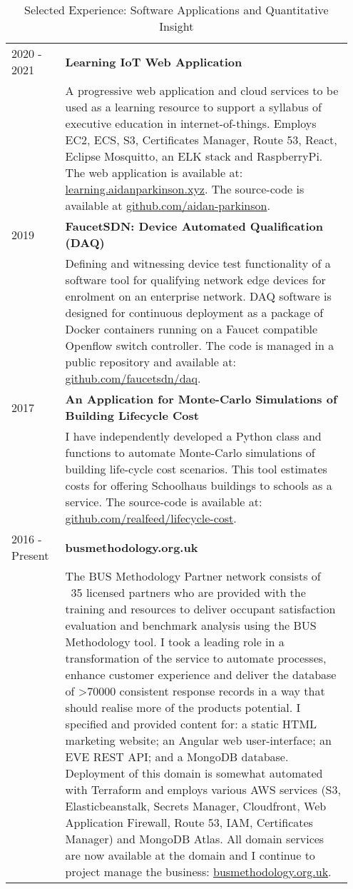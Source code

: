 \documentclass[11pt, oneside]{article}   	%
\begin{document}
\begin{table}[h]
\caption*{Selected Experience: Software Applications and Quantitative Insight}
\vspace{-5mm}
\small
\begin{center}
\begin{tabular}{p{0.15\linewidth} p{0.8\linewidth}}
\hline
2020 - 2021 &\textbf{Learning IoT Web Application} \\
&A progressive web application and cloud services to be used as a learning resource to support a syllabus of executive education in internet-of-things. Employs EC2, ECS, S3, Certificates Manager, Route 53, React, Eclipse Mosquitto, an ELK stack and RaspberryPi. The web application is available at: \href{learning.aidanparkinson.xyz}{learning.aidanparkinson.xyz}. The source-code is available at \href{github.com/aidan-parkinson}{github.com/aidan-parkinson}. \\
2019&\textbf{FaucetSDN: Device Automated Qualification (DAQ)} \\
&Defining and witnessing device test functionality of a software tool for qualifying network edge devices for enrolment on an enterprise network. DAQ software is designed for continuous deployment as a package of Docker containers running on a Faucet compatible Openflow switch controller. The code is managed in a public repository and available at: \href{github.com/faucetsdn/daq}{github.com/faucetsdn/daq}. \\
2017&\textbf{An Application for Monte-Carlo Simulations of Building Lifecycle Cost} \\
&I have independently developed a Python class and functions to automate Monte-Carlo simulations of building life-cycle cost scenarios. This tool estimates costs for offering Schoolhaus buildings to schools as a service. The source-code is available at: \href{github.com/realfeed/lifecycle-cost}{github.com/realfeed/lifecycle-cost}. \\
2016 - Present&\textbf{busmethodology.org.uk} \\
&The BUS Methodology Partner network consists of ~35 licensed partners who are provided with the training and resources to deliver occupant satisfaction evaluation and benchmark analysis using the BUS Methodology tool. I took a leading role in a transformation of the service to automate processes, enhance customer experience and deliver the database of >70000 consistent response records in a way that should realise more of the products potential. I specified and provided content for: a static HTML marketing website; an Angular web user-interface; an EVE REST API; and a MongoDB database. Deployment of this domain is somewhat automated with Terraform and employs various AWS services (S3, Elasticbeanstalk, Secrets Manager, Cloudfront, Web Application Firewall, Route 53, IAM, Certificates Manager) and MongoDB Atlas. All domain services are now available at the domain and I continue to project manage the business: \href{busmethodology.org.uk}{busmethodology.org.uk}. \\

\end{tabular}
\end{center}
\end{table}
\end{document}
